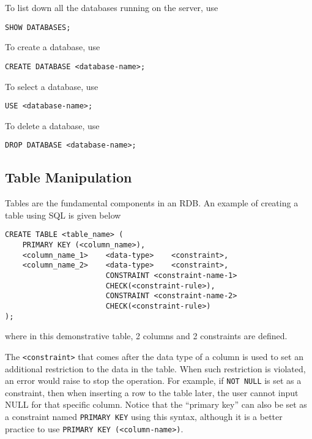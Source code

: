 To list down all the databases running on the server, use
\begin{lstlisting}
SHOW DATABASES;
\end{lstlisting}
To create a database, use
\begin{lstlisting}
CREATE DATABASE <database-name>;
\end{lstlisting}
To select a database, use
\begin{lstlisting}
USE <database-name>;
\end{lstlisting}
To delete a database, use
\begin{lstlisting}
DROP DATABASE <database-name>;
\end{lstlisting}

\subsection{Table Manipulation}

Tables are the fundamental components in an RDB. An example of creating a table using SQL is given below
\begin{lstlisting}
CREATE TABLE <table_name> (
    PRIMARY KEY (<column_name>),
    <column_name_1>    <data-type>    <constraint>,
    <column_name_2>    <data-type>    <constraint>,
                       CONSTRAINT <constraint-name-1>
                       CHECK(<constraint-rule>),
                       CONSTRAINT <constraint-name-2>
                       CHECK(<constraint-rule>)
);
\end{lstlisting}
where in this demonstrative table, 2 columns and 2 constraints are defined.

The \verb|<constraint>| that comes after the data type of a column is used to set an additional restriction to the data in the table. When such restriction is violated, an error would raise to stop the operation. For example, if \verb|NOT NULL| is set as a constraint, then when inserting a row to the table later, the user cannot input NULL for that specific column. Notice that the ``primary key'' can also be set as a constraint named \verb|PRIMARY KEY| using this syntax, although it is a better practice to use \verb|PRIMARY KEY (<column-name>)|.

